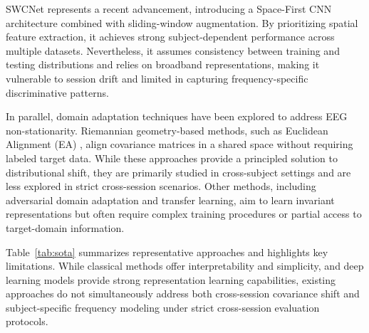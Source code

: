 \documentclass[conference]{IEEEtran}
\begin{document}
SWCNet \cite{b1} represents a recent advancement, introducing a Space-First CNN architecture combined with sliding-window augmentation. By prioritizing spatial feature extraction, it achieves strong subject-dependent performance across multiple datasets. Nevertheless, it assumes consistency between training and testing distributions and relies on broadband representations, making it vulnerable to session drift and limited in capturing frequency-specific discriminative patterns.

In parallel, domain adaptation techniques have been explored to address EEG non-stationarity. Riemannian geometry-based methods, such as Euclidean Alignment (EA) \cite{b16}, align covariance matrices in a shared space without requiring labeled target data. While these approaches provide a principled solution to distributional shift, they are primarily studied in cross-subject settings and are less explored in strict cross-session scenarios. Other methods, including adversarial domain adaptation and transfer learning, aim to learn invariant representations but often require complex training procedures or partial access to target-domain information.

Table~\ref{tab:sota} summarizes representative approaches and highlights key limitations. While classical methods offer interpretability and simplicity, and deep learning models provide strong representation learning capabilities, existing approaches do not simultaneously address both cross-session covariance shift and subject-specific frequency modeling under strict cross-session evaluation protocols.
\end{document}
